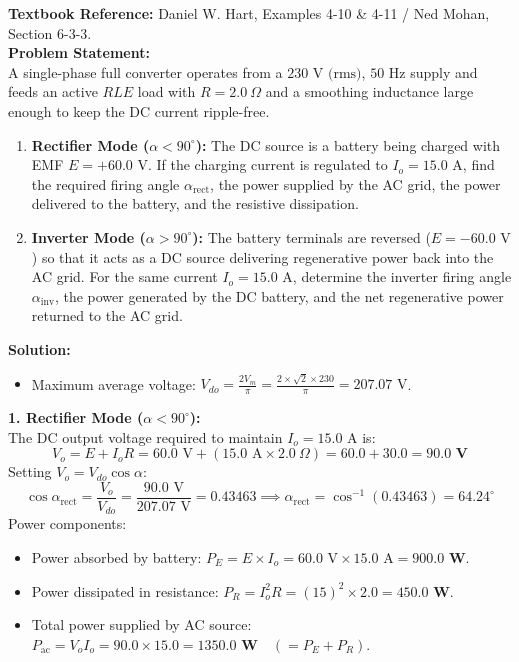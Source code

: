 \documentclass[10pt,a4paper]{article}
\begin{document}
\begin{tcolorbox}[qbox, title={Question 3: Single-Phase Full Converter with RLE Load --- Rectifier vs. Inverter Modes}]
\textbf{Textbook Reference:} Daniel W. Hart, Examples 4-10 \& 4-11 / Ned Mohan, Section 6-3-3.\\[1mm]
\textbf{Problem Statement:}\\
A single-phase full converter operates from a $230\text{ V (rms)}$, $50\text{ Hz}$ supply and feeds an active $RLE$ load with $R = 2.0\ \Omega$ and a smoothing inductance large enough to keep the DC current ripple-free.
\begin{enumerate}
  \item \textbf{Rectifier Mode ($\alpha < 90^\circ$):} The DC source is a battery being charged with EMF $E = +60.0\text{ V}$. If the charging current is regulated to $I_o = 15.0\text{ A}$, find the required firing angle $\alpha_{\text{rect}}$, the power supplied by the AC grid, the power delivered to the battery, and the resistive dissipation.
  \item \textbf{Inverter Mode ($\alpha > 90^\circ$):} The battery terminals are reversed ($E = -60.0\text{ V}$) so that it acts as a DC source delivering regenerative power back into the AC grid. For the same current $I_o = 15.0\text{ A}$, determine the inverter firing angle $\alpha_{\text{inv}}$, the power generated by the DC battery, and the net regenerative power returned to the AC grid.
\end{enumerate}
\end{tcolorbox}

\vspace{1mm}
\noindent\textbf{\textcolor{accentteal}{Solution:}}
\begin{itemize}
  \item Maximum average voltage: $V_{do} = \frac{2 V_m}{\pi} = \frac{2 \times \sqrt{2} \times 230}{\pi} = 207.07\text{ V}$.
\end{itemize}

\noindent\textbf{1. Rectifier Mode ($\alpha < 90^\circ$):}\\
The DC output voltage required to maintain $I_o = 15.0\text{ A}$ is:
\[
V_o = E + I_o R = 60.0\text{ V} + (15.0\text{ A} \times 2.0\ \Omega) = 60.0 + 30.0 = \mathbf{90.0\text{ V}}
\]
Setting $V_o = V_{do} \cos\alpha$:
\[
\cos\alpha_{\text{rect}} = \frac{V_o}{V_{do}} = \frac{90.0\text{ V}}{207.07\text{ V}} = 0.43463 \implies \alpha_{\text{rect}} = \cos^{-1}(0.43463) = \mathbf{64.24^\circ}
\]
Power components:
\begin{itemize}
  \item Power absorbed by battery: $P_E = E \times I_o = 60.0\text{ V} \times 15.0\text{ A} = \mathbf{900.0\text{ W}}$.
  \item Power dissipated in resistance: $P_R = I_o^2 R = (15)^2 \times 2.0 = \mathbf{450.0\text{ W}}$.
  \item Total power supplied by AC source: $P_{\text{ac}} = V_o I_o = 90.0 \times 15.0 = \mathbf{1350.0\text{ W}} \quad (= P_E + P_R)$.
\end{itemize}
\end{document}

